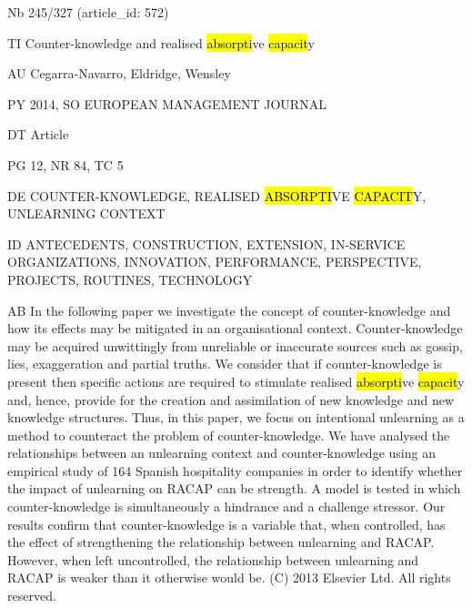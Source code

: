 \documentclass[a4paper]{article}
\begin{document}
\vspace*{-2cm}
Nb \tabto{0cm}245/327 (article\_id: 572)\par
TI \tabto{0cm}Counter-knowledge and realised \hl{absorpti}ve \hl{capacit}y\par
AU \tabto{0cm}Cegarra-Navarro, Eldridge, Wensley\par
PY \tabto{0cm}2014, SO EUROPEAN MANAGEMENT JOURNAL\par
DT \tabto{0cm}Article\par
PG \tabto{0cm}12, NR 84, TC 5\par
DE \tabto{0cm}COUNTER-KNOWLEDGE, REALISED \hl{ABSORPTI}VE \hl{CAPACIT}Y, UNLEARNING CONTEXT\par
ID \tabto{0cm}ANTECEDENTS, CONSTRUCTION, EXTENSION, IN-SERVICE ORGANIZATIONS, INNOVATION, PERFORMANCE, PERSPECTIVE, PROJECTS, ROUTINES, TECHNOLOGY\par
AB \tabto{0cm}In the following paper we investigate the concept of counter-knowledge and how its effects may be mitigated in an organisational context. Counter-knowledge may be acquired unwittingly from unreliable or inaccurate sources such as gossip, lies, exaggeration and partial truths. We consider that if counter-knowledge is present then specific actions are required to stimulate realised \hl{absorpti}ve \hl{capacit}y and, hence, provide for the creation and assimilation of new knowledge and new knowledge structures. Thus, in this paper, we focus on intentional unlearning as a method to counteract the problem of counter-knowledge. We have analysed the relationships between an unlearning context and counter-knowledge using an empirical study of 164 Spanish hospitality companies in order to identify whether the impact of unlearning on RACAP can be strength. A model is tested in which counter-knowledge is simultaneously a hindrance and a challenge stressor. Our results confirm that counter-knowledge is a variable that, when controlled, has the effect of strengthening the relationship between unlearning and RACAP. However, when left uncontrolled, the relationship between unlearning and RACAP is weaker than it otherwise would be. (C) 2013 Elsevier Ltd. All rights reserved.\par
\clearpage
\end{document}
